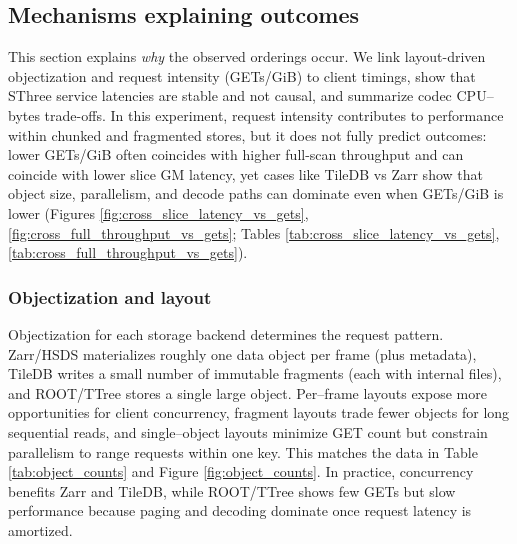 \documentclass[nomenclature, english, bibtex]{kththesis}
\numberwithin{listing}{chapter}
\begin{document}
\subsection{Mechanisms explaining outcomes}
This section explains \emph{why} the observed orderings occur. We link layout-driven objectization and request intensity (GETs/GiB) to client timings, show that \gls{SThree} service latencies are stable and not causal, and summarize codec \gls{CPU}–bytes trade-offs. In this experiment, request intensity contributes to performance within chunked and fragmented stores, but it does not fully predict outcomes: lower GETs/GiB often coincides with higher full-scan throughput and can coincide with lower slice \gls{GM} latency, yet cases like TileDB vs Zarr show that object size, parallelism, and decode paths can dominate even when GETs/GiB is lower (Figures \ref{fig:cross_slice_latency_vs_gets}, \ref{fig:cross_full_throughput_vs_gets}; Tables \ref{tab:cross_slice_latency_vs_gets}, \ref{tab:cross_full_throughput_vs_gets}).

\subsubsection{Objectization and layout}
Objectization for each storage backend determines the request pattern. Zarr/\gls{HSDS} materializes roughly one data object per frame (plus metadata), TileDB writes a small number of immutable fragments (each with internal files), and \gls{ROOT}/\gls{TTree} stores a single large object. Per–frame layouts expose more opportunities for client concurrency, fragment layouts trade fewer objects for long sequential reads, and single–object layouts minimize GET count but constrain parallelism to range requests within one key. This matches the data in Table \ref{tab:object_counts} and Figure \ref{fig:object_counts}. In practice, concurrency benefits Zarr and TileDB, while \gls{ROOT}/\gls{TTree} shows few GETs but slow performance because paging and decoding dominate once request latency is amortized.
\end{document}
